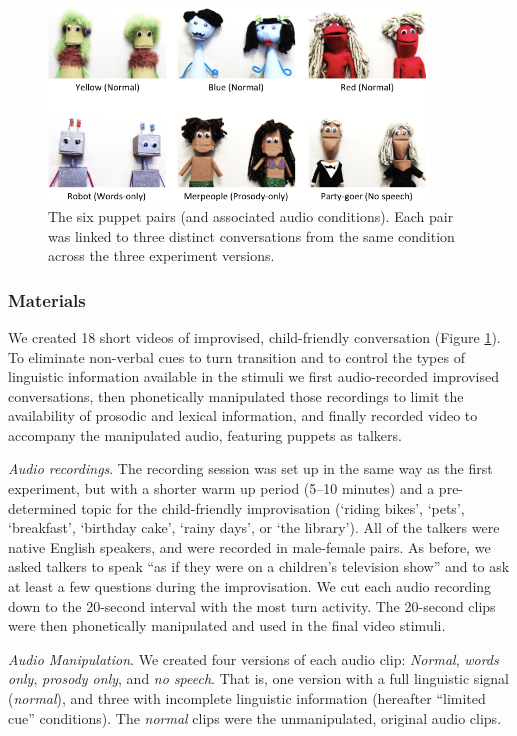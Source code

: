 \documentclass[authoryear, 12pt]{elsarticle}
\begin{document}
\begin{figure}[t]
\begin{center}
\includegraphics[width=0.9\textwidth]{figures/FIG-EN-stim.png}
\end{center}
\caption{The six puppet pairs (and associated audio conditions). Each pair was linked to three distinct conversations from the same condition across the three experiment versions.}
\label{fig:puppets}
\end{figure}

\subsubsection{Materials}
We created 18 short videos of improvised, child-friendly conversation (Figure \ref{fig:puppets}). To eliminate non-verbal cues to turn transition and to control the types of linguistic information available in the stimuli we first audio-recorded improvised conversations, then phonetically manipulated those recordings to limit the availability of prosodic and lexical information, and finally recorded video to accompany the manipulated audio, featuring puppets as talkers. 

\textit{Audio recordings}. The recording session was set up in the same way as the first experiment, but with a shorter warm up period (5--10 minutes) and a pre-determined topic for the child-friendly improvisation (`riding bikes', `pets', `breakfast', `birthday cake', `rainy days', or `the library'). All of the talkers were native English speakers, and were recorded in male-female pairs. As before, we asked talkers to speak ``as if they were on a children's television show'' and to ask at least a few questions during the improvisation. We cut each audio recording down to the 20-second interval with the most turn activity. The 20-second clips were then phonetically manipulated and used in the final video stimuli.

\textit{Audio Manipulation}. We created four versions of each audio clip: \textit{Normal}, \textit{words only}, \textit{prosody only}, and \textit{no speech}. That is, one version with a full linguistic signal (\textit{normal}), and three with incomplete linguistic information (hereafter ``limited cue'' conditions). The \textit{normal} clips were the unmanipulated, original audio clips. 
\end{document}
